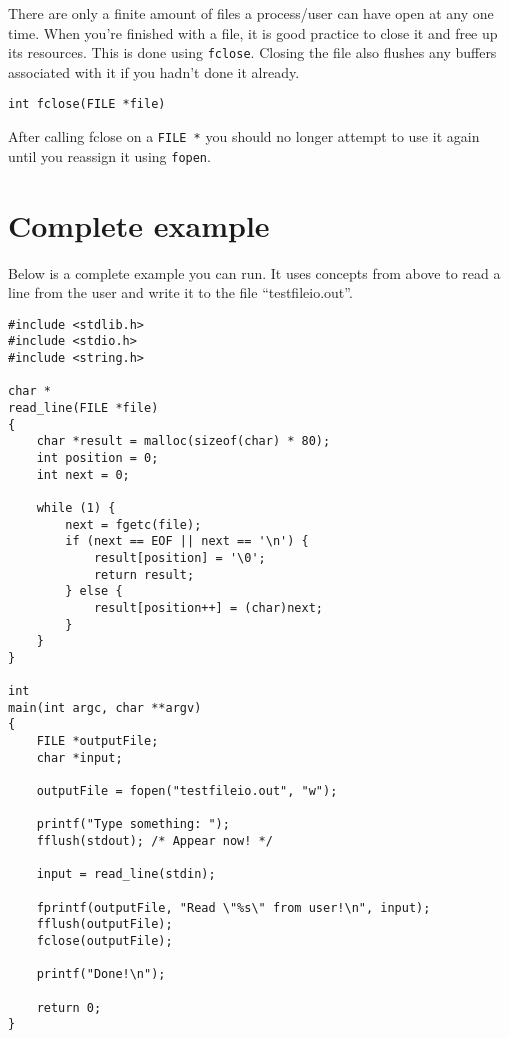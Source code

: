 There are only a finite amount of files a process/user can have open at any one time.
When you're finished with a file, it is good practice to close it and free up its resources.
This is done using \texttt{fclose}.
Closing the file also flushes any buffers associated with it if you hadn't done it already.

\begin{lstlisting}[numbers=none,frame=none]
int fclose(FILE *file)
\end{lstlisting}

After calling fclose on a \texttt{FILE *} you should no longer attempt to use it again until you reassign it using \texttt{fopen}.

\section{Complete example}

Below is a complete example you can run. 
It uses concepts from above to read a line from the user and write it to the file ``testfileio.out''.

\begin{lstlisting}
#include <stdlib.h>
#include <stdio.h>
#include <string.h>

char *
read_line(FILE *file)
{
    char *result = malloc(sizeof(char) * 80);
    int position = 0;
    int next = 0;

    while (1) {
        next = fgetc(file);
        if (next == EOF || next == '\n') {
            result[position] = '\0';
            return result;
        } else {
            result[position++] = (char)next;
        }
    }
}

int
main(int argc, char **argv)
{
    FILE *outputFile;
    char *input;

    outputFile = fopen("testfileio.out", "w");

    printf("Type something: ");
    fflush(stdout); /* Appear now! */

    input = read_line(stdin);

    fprintf(outputFile, "Read \"%s\" from user!\n", input);
    fflush(outputFile);
    fclose(outputFile);

    printf("Done!\n");

    return 0;
}
\end{lstlisting}
